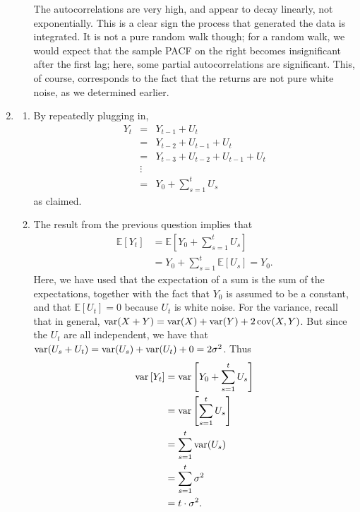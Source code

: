 \documentclass[11pt, a4paper]{article}
\newcommand{\E}{\ensuremath{{\mathbb E}}} %
\def\func#1{\mathop{\rm #1}}
\begin{document}
\begin{enumerate}
\begin{enumerate}
The autocorrelations are very high, and appear to decay linearly, not exponentially. This is a clear sign the process that generated the data is integrated. It is not a pure random walk though; for a random walk, we would expect that the sample PACF on the right becomes insignificant after the first lag; here, some partial autocorrelations are significant. This, of course, corresponds to the fact that the returns are not pure white noise, as we determined earlier.
\end{enumerate}
\item
\begin{enumerate}
\item By repeatedly plugging in,
\begin{eqnarray*}
Y_t&=&Y_{t-1}+U_t\\
   &=&Y_{t-2}+U_{t-1}+U_t\\
   &=&Y_{t-3}+U_{t-2}+U_{t-1}+U_t\\
&\vdots&\\
&=&Y_0+\sum_{s=1}^t U_s
\end{eqnarray*}
as claimed.
\item The result from the previous question implies that
\begin{align*}
\E\left[Y_t\right]&=\E\left[Y_0+\sum_{s=1}^t U_s\right]\\
&=Y_0+\sum_{s=1}^t \E[U_s]=Y_0.
\end{align*}
Here, we have used that the expectation of a sum is the sum of the expectations, together with the fact that $Y_0$ is assumed to be a constant, and that $\E[U_t]=0$ because $U_t$ is white noise.
For the variance, recall that in general, $\func{var}(X+Y)=\func{var}(X)+\func{var}(Y)+2\func{cov}(X, Y)$. But since the $U_t$ are all independent, we have that $\func{var}(U_s+U_t)=\func{var}(U_s)+\func{var}(U_t)+0=2\sigma^2$. Thus
\begin{align*}
\func{var}\left[Y_t\right]&=\func{var}\left[Y_0+\sum_{s=1}^t U_s\right]\\
&=\func{var}\left[\sum_{s=1}^t U_s\right]\\
&=\sum_{s=1}^t \func{var}(U_s)\\
&=\sum_{s=1}^t \sigma^2\\
&=t\cdot\sigma^2.
\end{align*}

\end{enumerate}

\end{enumerate}
\end{document}
